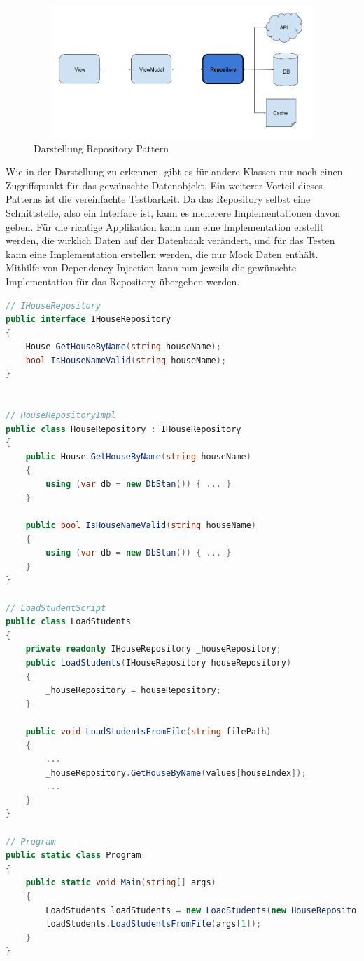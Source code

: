 \documentclass[a4paper, table]{article}
\begin{document}
\begin{figure}[h]
    \centering
    \includegraphics[width=1\textwidth,height=5cm]{img/Repository_Pattern.png}
    \caption{Darstellung Repository Pattern}
    \label{fig:repository_pattern}
\end{figure}

Wie in der Darstellung zu erkennen, gibt es für andere Klassen nur noch einen Zugriffspunkt für das gewünschte Datenobjekt.
\newline
Ein weiterer Vorteil dieses Patterns ist die vereinfachte Testbarkeit.
Da das Repository selbst eine Schnittstelle, also ein Interface ist, kann es meherere Implementationen davon geben.
Für die richtige Applikation kann nun eine Implementation erstellt werden, die wirklich Daten auf der Datenbank verändert,
und für das Testen kann eine Implementation erstellen werden, die nur Mock Daten enthält.\\
Mithilfe von Dependency Injection kann nun jeweils die gewünschte Implementation für das Repository übergeben werden.

\begin{lstlisting}[language=csharp]
// IHouseRepository
public interface IHouseRepository
{
    House GetHouseByName(string houseName);
    bool IsHouseNameValid(string houseName);
}


// HouseRepositoryImpl
public class HouseRepository : IHouseRepository
{
    public House GetHouseByName(string houseName)
    {
        using (var db = new DbStan()) { ... }
    }

    public bool IsHouseNameValid(string houseName)
    {
        using (var db = new DbStan()) { ... }
    }
}

// LoadStudentScript
public class LoadStudents
{
    private readonly IHouseRepository _houseRepository;
    public LoadStudents(IHouseRepository houseRepository)
    {
        _houseRepository = houseRepository;
    }

    public void LoadStudentsFromFile(string filePath)
    {
        ...
        _houseRepository.GetHouseByName(values[houseIndex]);
        ...
    }
}

// Program
public static class Program
{
    public static void Main(string[] args)
    {
        LoadStudents loadStudents = new LoadStudents(new HouseRepository());
        loadStudents.LoadStudentsFromFile(args[1]);
    }
}
\end{lstlisting}
\end{document}
